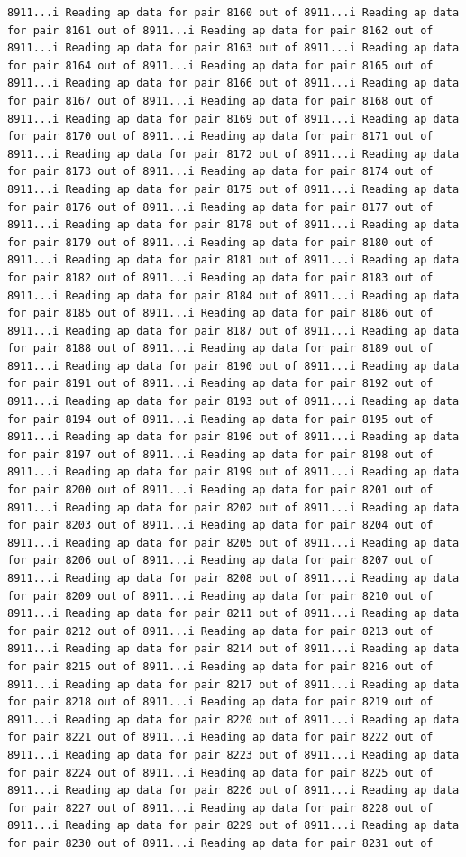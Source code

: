 \documentclass[
]{article}
\begin{document}
\begin{verbatim}
8911...i Reading ap data for pair 8160 out of 8911...i Reading ap data for pair 8161 out of 8911...i Reading ap data for pair 8162 out of 8911...i Reading ap data for pair 8163 out of 8911...i Reading ap data for pair 8164 out of 8911...i Reading ap data for pair 8165 out of 8911...i Reading ap data for pair 8166 out of 8911...i Reading ap data for pair 8167 out of 8911...i Reading ap data for pair 8168 out of 8911...i Reading ap data for pair 8169 out of 8911...i Reading ap data for pair 8170 out of 8911...i Reading ap data for pair 8171 out of 8911...i Reading ap data for pair 8172 out of 8911...i Reading ap data for pair 8173 out of 8911...i Reading ap data for pair 8174 out of 8911...i Reading ap data for pair 8175 out of 8911...i Reading ap data for pair 8176 out of 8911...i Reading ap data for pair 8177 out of 8911...i Reading ap data for pair 8178 out of 8911...i Reading ap data for pair 8179 out of 8911...i Reading ap data for pair 8180 out of 8911...i Reading ap data for pair 8181 out of 8911...i Reading ap data for pair 8182 out of 8911...i Reading ap data for pair 8183 out of 8911...i Reading ap data for pair 8184 out of 8911...i Reading ap data for pair 8185 out of 8911...i Reading ap data for pair 8186 out of 8911...i Reading ap data for pair 8187 out of 8911...i Reading ap data for pair 8188 out of 8911...i Reading ap data for pair 8189 out of 8911...i Reading ap data for pair 8190 out of 8911...i Reading ap data for pair 8191 out of 8911...i Reading ap data for pair 8192 out of 8911...i Reading ap data for pair 8193 out of 8911...i Reading ap data for pair 8194 out of 8911...i Reading ap data for pair 8195 out of 8911...i Reading ap data for pair 8196 out of 8911...i Reading ap data for pair 8197 out of 8911...i Reading ap data for pair 8198 out of 8911...i Reading ap data for pair 8199 out of 8911...i Reading ap data for pair 8200 out of 8911...i Reading ap data for pair 8201 out of 8911...i Reading ap data for pair 8202 out of 8911...i Reading ap data for pair 8203 out of 8911...i Reading ap data for pair 8204 out of 8911...i Reading ap data for pair 8205 out of 8911...i Reading ap data for pair 8206 out of 8911...i Reading ap data for pair 8207 out of 8911...i Reading ap data for pair 8208 out of 8911...i Reading ap data for pair 8209 out of 8911...i Reading ap data for pair 8210 out of 8911...i Reading ap data for pair 8211 out of 8911...i Reading ap data for pair 8212 out of 8911...i Reading ap data for pair 8213 out of 8911...i Reading ap data for pair 8214 out of 8911...i Reading ap data for pair 8215 out of 8911...i Reading ap data for pair 8216 out of 8911...i Reading ap data for pair 8217 out of 8911...i Reading ap data for pair 8218 out of 8911...i Reading ap data for pair 8219 out of 8911...i Reading ap data for pair 8220 out of 8911...i Reading ap data for pair 8221 out of 8911...i Reading ap data for pair 8222 out of 8911...i Reading ap data for pair 8223 out of 8911...i Reading ap data for pair 8224 out of 8911...i Reading ap data for pair 8225 out of 8911...i Reading ap data for pair 8226 out of 8911...i Reading ap data for pair 8227 out of 8911...i Reading ap data for pair 8228 out of 8911...i Reading ap data for pair 8229 out of 8911...i Reading ap data for pair 8230 out of 8911...i Reading ap data for pair 8231 out of 
\end{verbatim}
\end{document}
